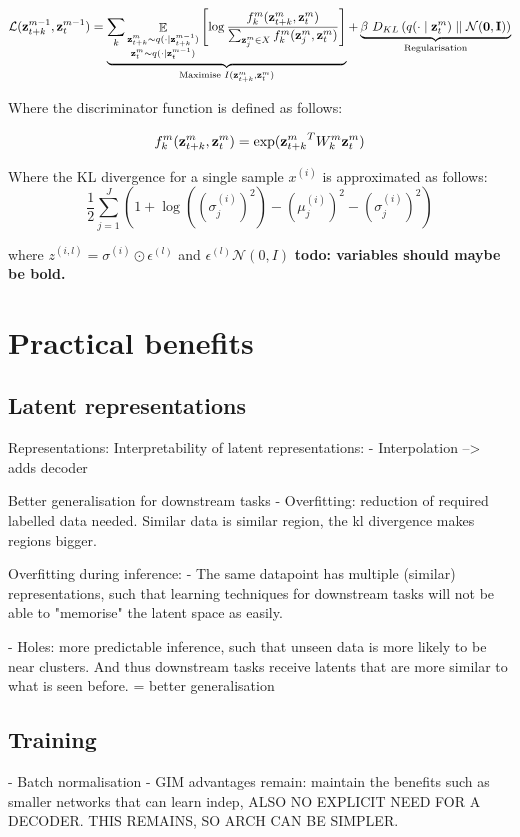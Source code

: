 	\begin{equation} %
		\mathcal{L}(\ztk^{m-1}, \zt^{m-1}) = 
		\underbrace{\reconstrgim}_{\text{Maximise } I(\ztk^m, \zt^m)} + \underbrace{\beta ~ \latentspaceconstraintgim}_{\text{Regularisation}}
		\label{eq:variational_gim_loss}
	\end{equation}

	Where the discriminator function is defined as follows:
	
	$$ f_k^m(\mathbf{z}_{t+k}^m,\mathbf{z}_t^m) = \exp({\mathbf{z}_{t+k}^m}^TW_k^m\mathbf{z}_t^m) $$


	Where the KL divergence for a single sample $x^{(i)}$ is approximated as follows:
	\begin{equation}
		\frac{1}{2}\sum_{j=1}^J \left( 1 + \log((\sigma_j^{(i)})^2) - (\mu_j^{(i)})^2 - (\sigma_j^{(i)})^2 \right) 
	\end{equation}
	
	
	where $z^(i,l) = \sigma ^{(i)} \odot \epsilon^{(l)}$ and $\epsilon^(l) \mathcal{N}(0, I)$
	\textbf{todo: variables should maybe be bold.}
	
	
	
	
\section{Practical benefits}

\subsection{Latent representations}
	Representations:
		Interpretability of latent representations:
			- Interpolation --> adds decoder
	
	Better generalisation for downstream tasks
		- Overfitting: reduction of required labelled data needed. Similar data is similar region, the kl divergence makes regions bigger.

		Overfitting during inference:
		- The same datapoint has multiple (similar) representations, such that learning techniques for downstream tasks will not be able to "memorise" the latent space as easily.
		
		- Holes: more predictable inference, such that unseen data is more likely to be near clusters. And thus downstream tasks receive latents that are more similar to what is seen before.
		= better generalisation

\subsection{Training}
	- Batch normalisation
	- GIM advantages remain: maintain the benefits such as smaller networks that can learn indep, ALSO NO EXPLICIT NEED FOR A DECODER. THIS REMAINS, SO ARCH CAN BE SIMPLER.
	

